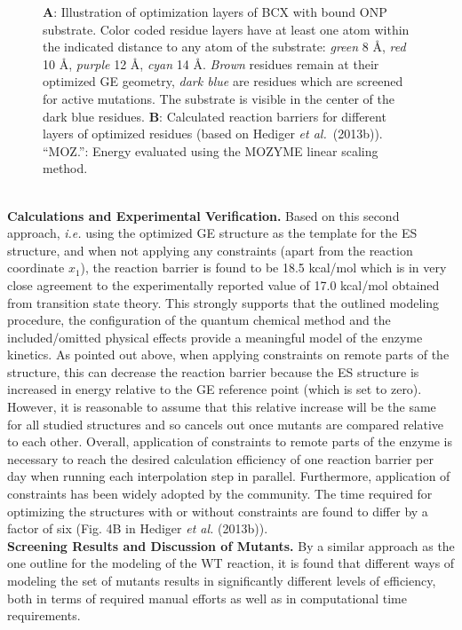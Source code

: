 \begin{figure}[htbp]
\begin{minipage}{0.51\linewidth}
\end{minipage}
\caption{
\textbf{A}: Illustration of optimization layers of BCX with bound ONP substrate.
Color coded residue layers have at least one atom within the indicated distance to any atom of the substrate:
\textit{green} 8 \AA, \textit{red} 10 \AA, \textit{purple} 12 \AA, \textit{cyan} 14 \AA.
\textit{Brown} residues remain at their optimized GE geometry, \textit{dark blue} are residues which are screened for active mutations.
The substrate is visible in the center of the dark blue residues.
\textbf{B}: Calculated reaction barriers for different layers of optimized residues (based on Hediger \textit{et al.} (2013b)).
``MOZ.'': Energy evaluated using the MOZYME linear scaling method.
}
\label{fig:bcx_constr_constraint_layers}
\end{figure}
\\
\textbf{Calculations and Experimental Verification.}
Based on this second approach, \textit{i.e.} using the optimized GE structure as the template for the ES structure, and when not applying any constraints (apart from the reaction coordinate $x_1$), the reaction barrier is found to be 18.5 kcal/mol which is in very close agreement to the experimentally reported value of 17.0 kcal/mol obtained from transition state theory\cite{joshi2000hydrogen}.
This strongly supports that the outlined modeling procedure, the configuration of the quantum chemical method and the included/omitted physical effects provide a meaningful model of the enzyme kinetics.
As pointed out above, when applying constraints on remote parts of the structure, this can decrease the reaction barrier because the ES structure is increased in energy relative to the GE reference point (which is set to zero).
However, it is reasonable to assume that this relative increase will be the same for all studied structures and so cancels out once mutants are compared relative to each other.  
Overall, application of constraints to remote parts of the enzyme is necessary to reach the desired calculation efficiency of one reaction barrier per day when running each interpolation step in parallel.
Furthermore, application of constraints has been widely adopted by the community\cite{himo2006quantum,siegbahn2009recent,liao2012comparison,lonsdale2013quantum}.
The time required for optimizing the structures with or without constraints are found to differ by a factor of six (Fig. 4B in Hediger \textit{et al.} (2013b)).\\
\textbf{Screening Results and Discussion of Mutants.}
By a similar approach as the one outline for the modeling of the WT reaction, it is found that different ways of modeling the set of mutants results in significantly different levels of efficiency, both in terms of required manual efforts as well as in computational time requirements.
